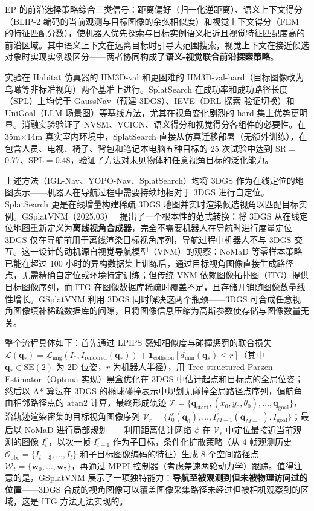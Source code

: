 EP 的前沿选择策略综合三类信号：距离偏好（归一化逆距离）、语义上下文得分（BLIP-2 编码的当前观测与目标图像的余弦相似度）和视觉上下文得分（FEM 的特征匹配分数），使机器人优先探索与目标实例语义相近且视觉特征匹配度高的前沿区域。其中语义上下文在远离目标时引导大范围搜索，视觉上下文在接近候选对象时实现实例级区分——两者协同构成了\textbf{语义-视觉联合前沿探索策略}。

实验在 Habitat 仿真器的 HM3D-val 和更困难的 HM3D-val-hard（目标图像改为鸟瞰等非标准视角）两个基准上进行。SplatSearch 在成功率和成功路径长度（SPL）上均优于 GaussNav（预建 3DGS）、IEVE（DRL 探索-验证切换）和 UniGoal（LLM 场景图）等基线方法，尤其在视角变化剧烈的 hard 集上优势更明显。消融实验验证了 NVSM、VCICN、语义得分和视觉得分各组件的必要性。在 35m$\times$14m 真实室内环境中，SplatSearch 直接从仿真迁移部署（无额外训练），在包含人员、电视、椅子、背包和笔记本电脑五种目标的 25 次试验中达到 SR$=$0.77、SPL$=$0.48，验证了方法对未见物体和任意视角目标的泛化能力。

上述方法（IGL-Nav、YOPO-Nav、SplatSearch）均将 3DGS 作为在线定位的地图表示——机器人在导航过程中需要持续地相对于 3DGS 进行自定位。SplatSearch 更是在线增量构建稀疏 3DGS 地图并实时渲染候选视角以匹配目标实例。GSplatVNM（2025.03）~\cite{2503_05152} 提出了一个根本性的范式转换：将 3DGS 从在线定位地图重新定义为\textbf{离线视角合成器}，完全不需要机器人在导航时进行度量定位——3DGS 仅在导航前用于离线渲染目标视角序列，导航过程中机器人不与 3DGS 交互。这一设计的动机源自视觉导航模型（VNM）的观察：NoMaD 等零样本策略已能在超过 100 小时的异构数据集上训练后，通过目标视角图像直接生成路径点，无需精确自定位或环境特定训练；但传统 VNM 依赖图像拓扑图（ITG）提供目标图像序列，而 ITG 在图像数据库稀疏时覆盖不足，且存储开销随图像数量线性增长。GSplatVNM 利用 3DGS 同时解决这两个瓶颈——3DGS 可合成任意视角图像填补稀疏数据库的间隙，且将图像信息压缩为高斯参数使存储与图像数量无关。

整个流程具体如下：首先通过 LPIPS 感知相似度与碰撞惩罚的联合损失 $\mathcal{L}(\mathbf{q}_*) = \mathcal{L}_\text{img}(I_*, I_\text{rendered}(\mathbf{q}_*)) + \mathbf{1}_\text{collision}[d_\text{min}(\mathbf{q}_*) \leq r]$（其中 $\mathbf{q}_* \in \mathrm{SE}(2)$ 为 2D 位姿，$r$ 为机器人半径），用 Tree-structured Parzen Estimator（Optuna 实现）黑盒优化在 3DGS 中估计起点和目标点的全局位姿；然后以 A* 算法在 3DGS 的椭球碰撞表示中规划无碰撞全局路径点序列，偏航角由相邻路径点的 $\mathrm{atan2}$ 计算，最终形成轨迹 $\mathcal{T} = \{\mathbf{q}_\text{start}, (x_0, y_0, \theta_0), \ldots, \mathbf{q}_\text{goal}\}$，沿轨迹渲染密集的目标视角图像序列 $\mathcal{V}_r = \{I_0^r(\mathbf{q}_0), \ldots, I_{M-1}^r(\mathbf{q}_{M-1}), I_\text{goal}\}$；最后以 NoMaD 进行局部规划——利用距离估计网络 $\phi$ 在 $\mathcal{V}_r$ 中定位最接近当前观测的图像 $I_t^r$，以次一帧 $I_{t+1}^r$ 作为子目标，条件化扩散策略（从 4 帧观测历史 $\mathcal{O}_\text{obs} = \{I_{t-3}, \ldots, I_t\}$ 和子目标图像编码的特征）生成 8 个空间路径点 $\mathcal{W}_t = \{\mathbf{w}_0, \ldots, \mathbf{w}_7\}$，再通过 MPPI 控制器（考虑差速两轮动力学）跟踪。值得注意的是，GSplatVNM 展示了一项独特能力：\textbf{导航至被观测到但未被物理访问过的位置}——3DGS 合成的视角图像可以覆盖图像采集路径未经过但被相机观察到的区域，这是 ITG 方法无法实现的。

